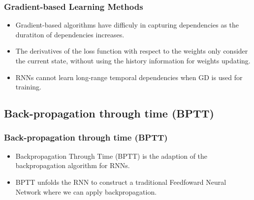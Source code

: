 \documentclass[11pt,]{beamer}
\begin{document}

\begin{frame}
	\frametitle{Gradient-based Learning Methods}
	\begin{itemize}
		\item Gradient-based algorithms have difficuly in capturing dependencies as the duratiton of dependencies increases.
		\bigskip
		\item The derivatives of the loss function with respect to the weights only consider the current state, without using the history information for weights updating.
		\bigskip
		\item  RNNs cannot learn long-range temporal dependencies when GD is used for training.
	\end{itemize}
\end{frame}

\subsection{Back-propagation through time (BPTT)}

\begin{frame}
	\frametitle{Back-propagation through time (BPTT)}
	\begin{itemize}
		\item Backpropagation Through Time (BPTT) is the adaption of the backpropagation algorithm for RNNs.
		\bigskip 
		\item BPTT unfolds the RNN to construct a traditional Feedfoward Neural Network where we can apply backpropagation.
        \bigskip %
		\par
		\hfill
		\par

			
\end{itemize}
\end{frame}

\end{document}
